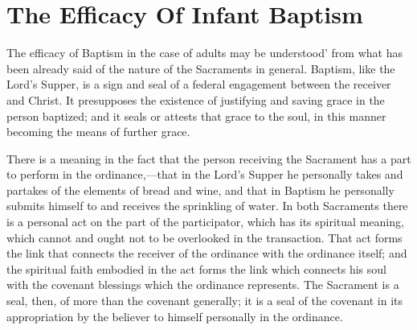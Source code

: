 \documentclass[english,]{book}
\begin{document}
\hypertarget{the-efficacy-of-infant-baptism}{%
\section{The Efficacy Of Infant Baptism}\label{the-efficacy-of-infant-baptism}}

The efficacy of Baptism in the case of adults may be understood' from what has been already said of the nature of the Sacraments in general. Baptism, like the Lord's Supper, is a sign and seal of a federal engagement between the receiver and Christ. It presupposes the existence of justifying and saving grace in the person baptized; and it seals or attests that grace to the soul, in this manner becoming the means of further grace.

There is a meaning in the fact that the person receiving the Sacrament has a part to perform in the ordinance,---that in the Lord's Supper he personally takes and partakes of the elements of bread and wine, and that in Baptism he personally submits himself to and receives the sprinkling of water. In both Sacraments there is a personal act on the part of the participator, which has its spiritual meaning, which cannot and ought not to be overlooked in the transaction. That act forms the link that connects the receiver of the ordinance with the ordinance itself; and the spiritual faith embodied in the act forms the link which connects his soul with the covenant blessings which the ordinance represents. The Sacrament is a seal, then, of more than the covenant generally; it is a seal of the covenant in its appropriation by the believer to himself personally in the ordinance.
\end{document}
